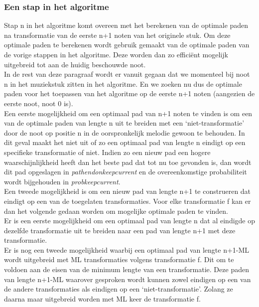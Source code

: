 \subsubsection{Een stap in het algoritme}
Stap n in het algoritme komt overeen met het berekenen van de optimale paden na transformatie van de eerste n+1 noten van het originele stuk. Om deze optimale paden te berekenen wordt gebruik gemaakt van de optimale paden van de vorige stappen in het algoritme. Deze worden dan zo effici\"ent mogelijk uitgebreid tot aan de huidig beschouwde noot.\\ 
In de rest van deze paragraaf wordt er vanuit gegaan dat we momenteel bij noot n in het muziekstuk zitten in het algoritme. En we zoeken nu dus de optimale paden voor het toepassen van het algoritme op de eerste n+1 noten (aangezien de eerste noot, noot 0 is).\\
Een eerste mogelijkheid om een optimaal pad van n+1 noten te vinden is om een van de optimale paden van lengte n uit te breiden met een `niet-transformatie' door de noot op positie n in de oorspronkelijk melodie gewoon te behouden. In dit geval maakt het niet uit of zo een optimaal pad van lengte n eindigt op een specifieke transformatie of niet. Indien zo een nieuw pad een hogere waarschijnlijkheid heeft dan het beste pad dat tot nu toe gevonden is, dan wordt dit pad opgeslagen in \textit{path\textunderscore end\textunderscore on\textunderscore keep\textunderscore current} en de overeenkomstige probabiliteit wordt bijgehouden in \textit{prob\textunderscore keep\textunderscore current}.\\
Een tweede mogelijkheid is om een nieuw pad van lengte n+1 te construeren dat eindigt op een van de toegelaten transformaties. Voor elke transformatie f kan er dan het volgende gedaan worden om mogelijke optimale paden te vinden.\\ 
Er is een eerste mogelijkheid om een optimaal pad van lengte n dat al eindigde op dezelfde transformatie uit te breiden naar een pad van lengte n+1 met deze transformatie. \\
Er is nog een tweede mogelijkheid waarbij een optimaal pad van lengte n+1-ML wordt uitgebreid met ML transformaties volgens transformatie f. Dit om te voldoen aan de eisen van de minimum lengte van een transformatie. Deze paden van lengte n+1-ML waarover gesproken wordt kunnen zowel eindigen op een van de andere transformaties als eindigen op een `niet-transformatie'. Zolang ze daarna maar uitgebreid worden met ML keer de transformatie f.\\ 
